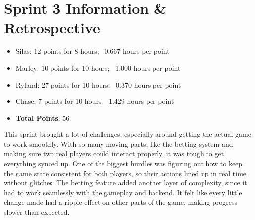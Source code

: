 \pagebreak
\section{Sprint 3 Information \& Retrospective}
\begin{itemize}
    \item Silas: 12 points for 8 hours; ~0.667 hours per point
    \item Marley: 10 points for 10 hours; ~1.000 hours per point
    \item Ryland: 27 points for 10 hours; ~0.370 hours per point
    \item Chase: 7 points for 10 hours; ~1.429 hours per point
    \item \textbf{Total Points}: 56
\end{itemize}

\begin{table}[htbp]
\centering
{}
\caption{Delegation of user stories amongst group members for sprint 3}
\end{table}

\setlength{\parskip}{1em}
\noindent This sprint brought a lot of challenges, especially around getting the actual game to work smoothly. With so many moving parts, like the betting system and making sure two real players could interact properly, it was tough to get everything synced up. One of the biggest hurdles was figuring out how to keep the game state consistent for both players, so their actions lined up in real time without glitches. The betting feature added another layer of complexity, since it had to work seamlessly with the gameplay and backend. It felt like every little change made had a ripple effect on other parts of the game, making progress slower than expected.

